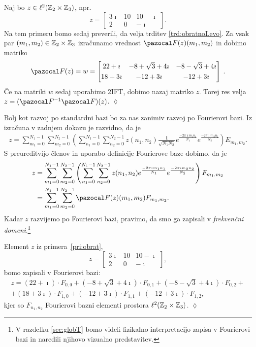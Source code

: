 \begin{primer}\label{pri:obrat}
Naj bo $z \in \ell^2(\mathbb Z_{2} \times \mathbb Z_{3})$, npr.
%
$$z = \begin{bmatrix}
      3\imath & 10 & 10 - \imath\\
      2 & 0 & -\imath
    \end{bmatrix}.$$
%
Na tem primeru bomo sedaj preverili, da velja trditev \ref{trd:obratnoLevo}. Za vsak par $(m_1, m_2) \in \mathbb Z_{2} \times \mathbb Z_{3}$ izračunamo vrednost $\F(z)(m_1, m_2)$ in dobimo matriko
%
$$  \F(z) = w = 
    \begin{bmatrix}
      22+\imath & -8 + \sqrt{3} +4\imath & -8 - \sqrt{3} +4\imath \\[0.1cm]
      18+3\imath & -12 + 3\imath & -12+3\imath
    \end{bmatrix}\;.$$
%
Če na matriki $w$ sedaj uporabimo 2IFT, dobimo nazaj matriko $z$. Torej res velja $z = (\F^{-1}\F)(z)$. \hfill $\lozenge$
\end{primer}
%
Bolj kot razvoj po standardni bazi bo za nas zanimiv razvoj po Fourierovi bazi. Iz izračuna v zadnjem dokazu je razvidno, da je
\begin{align}\label{eq:primerjava}
z = \sum_{m_1 = 0}^{N_1 - 1} \sum_{m_2 = 0}^{N_2 - 1} \left(\sum_{n_1 = 0}^{N_1 - 1} \sum_{n_2 = 0}^{N_2 - 1} z(n_1, n_2) \frac{1}{\sqrt{N_1N_2}} e^{\frac{-2\pi \imath m_1n_1}{N_1}} e^{\frac{-2\pi \imath m_2n_2}{N_2}}\right) E_{m_1, m_2}.
\end{align}
%
S preureditvijo členov in uporabo definicije Fourierove baze dobimo, da je
\begin{align*}
z & = \sum_{m_1 = 0}^{N_1 - 1} \sum_{m_2 = 0}^{N_2 - 1} \left(\sum_{n_1 = 0}^{N_1 - 1} \sum_{n_2 = 0}^{N_2 - 1} z(n_1, n_2) e^{\frac{-2\pi \imath m_1n_1}{N_1}} e^{\frac{-2\pi \imath m_2n_2}{N_2}}\right) F_{m_1,m_2} \\
& = \sum_{m_1 = 0}^{N_1 - 1} \sum_{m_2 = 0}^{N_2 - 1} \F(z)(m_1, m_2) F_{m_1, m_2}.
\end{align*}
%
Kadar $z$ razvijemo po Fourierovi bazi, pravimo, da smo ga zapisali v \emph{frekvenčni domeni}.\footnote{V razdelku \ref{sec:globT} bomo videli fizikalno interpretacijo zapisa v Fourierovi bazi in naredili njihovo vizualno predstavitev.} %
%
\begin{primer}
Element $z$ iz primera~\ref{pri:obrat},
%
$$z = \begin{bmatrix}
      3\imath & 10 & 10 - \imath\\
      2 & 0 & -\imath
    \end{bmatrix},$$
%
bomo zapisali v Fourierovi bazi:
\begin{multline*}
z = (22+\imath) \cdot F_{0,0} + (-8 + \sqrt{3} +4\imath) \cdot F_{0,1} + (-8 - \sqrt{3} +4\imath) \cdot F_{0,2} + \\
+ (18+3\imath) \cdot F_{1,0} + (-12 + 3\imath) \cdot F_{1,1}+ (-12+3\imath) \cdot F_{1,2},
\end{multline*}
kjer so $F_{n_1, n_2}$ Fourierovi bazni elementi prostora $\ell^2(\mathbb Z_2 \times \mathbb Z_3)$.
\hfill $\lozenge$
\end{primer}
